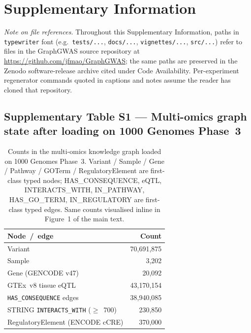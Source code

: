 \section*{Supplementary Information}

\setcounter{figure}{0}
\renewcommand{\thefigure}{S\arabic{figure}}
\setcounter{table}{0}
\renewcommand{\thetable}{S\arabic{table}}

\noindent\textit{Note on file references.}\hspace{1ex}%
Throughout this Supplementary Information, paths in
\texttt{typewriter} font (e.g.\ \texttt{tests/...}, \texttt{docs/...},
\texttt{vignettes/...}, \texttt{src/...}) refer to files in the
GraphGWAS source repository at
\url{https://github.com/jfmao/GraphGWAS}; the same paths are
preserved in the Zenodo software-release archive cited under Code
Availability. Per-experiment regenerator commands quoted in
captions and notes assume the reader has cloned that repository.


\subsection*{Supplementary Table S1 --- Multi-omics graph state after loading on 1000 Genomes Phase~3}

\begin{table}[htbp]
\centering
\small
\begin{tabular}{lr}
\toprule
Node~/~edge & Count \\
\midrule
Variant & 70{,}691{,}875 \\
Sample & 3{,}202 \\
Gene (GENCODE v47) & 20{,}092 \\
GTEx~v8 tissue eQTL & 43{,}170{,}154 \\
\texttt{HAS\_CONSEQUENCE} edges & 38{,}940{,}085 \\
STRING \texttt{INTERACTS\_WITH} ($\geq$~700) & 230{,}850 \\
RegulatoryElement (ENCODE cCRE) & 370{,}000 \\
\bottomrule
\end{tabular}
\caption{Counts in the multi-omics knowledge graph loaded on 1000
Genomes Phase~3. Variant / Sample / Gene / Pathway / GOTerm /
RegulatoryElement are first-class typed nodes; HAS\_CONSEQUENCE,
eQTL, INTERACTS\_WITH, IN\_PATHWAY, HAS\_GO\_TERM,
IN\_REGULATORY are first-class typed edges. Same counts visualised
inline in Figure~1 of the main text.}
\label{tab:sup_graph}
\end{table}

